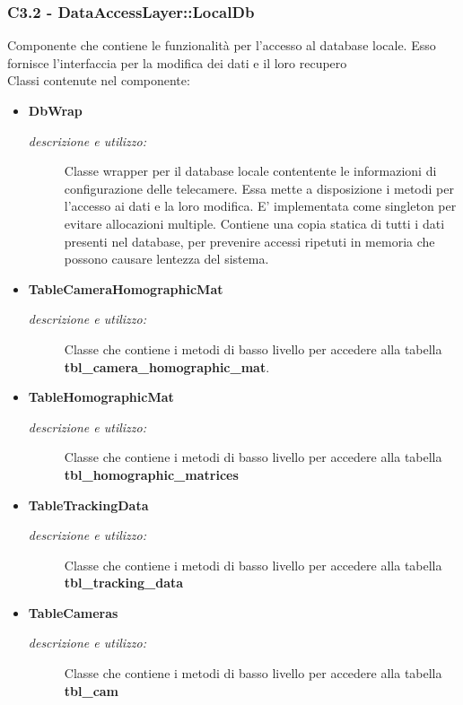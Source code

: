 \subsubsection{C3.2 - DataAccessLayer::LocalDb} \label{sec:c3.2}
Componente che contiene le funzionalità per l'accesso al database locale. Esso fornisce l'interfaccia per la modifica dei dati e il loro recupero\\
Classi contenute nel componente: 
\begin{itemize} 
\item \textbf{DbWrap}
\begin{description}
\item [\textit{descrizione e utilizzo:}] Classe wrapper per il database locale contentente le informazioni di configurazione delle telecamere. Essa mette a disposizione i metodi per l'accesso ai dati e la loro modifica. E' implementata come singleton per evitare allocazioni multiple. Contiene una copia statica di tutti i dati presenti nel database, per prevenire accessi ripetuti in memoria che possono causare lentezza del sistema.
\end{description}
\item \textbf{TableCameraHomographicMat}
\begin{description}
\item [\textit{descrizione e utilizzo:}] Classe che contiene i metodi di basso livello per accedere alla tabella \textbf{tbl_camera_homographic_mat}. 
\end{description}
\item \textbf{TableHomographicMat}
\begin{description}
\item [\textit{descrizione e utilizzo:}] Classe che contiene i metodi di basso livello per accedere alla tabella \textbf{tbl_homographic_matrices}
\end{description}
\item \textbf{TableTrackingData}
\begin{description}
\item [\textit{descrizione e utilizzo:}] Classe che contiene i metodi di basso livello per accedere alla tabella \textbf{tbl_tracking_data}
\end{description}
\item \textbf{TableCameras}
\begin{description}
\item [\textit{descrizione e utilizzo:}] Classe che contiene i metodi di basso livello per accedere alla tabella \textbf{tbl_cam}
\end{description}

\end{itemize}

